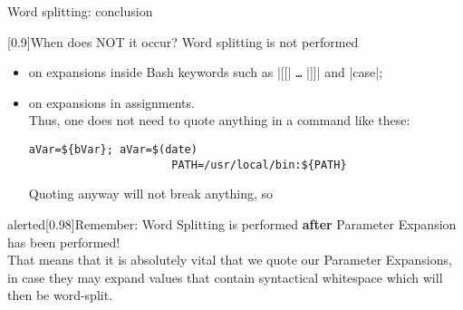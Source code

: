 \begin{frame}[fragile]{Word splitting: conclusion}
    \vspace{-4  mm}
        \begin{varblock*}{}[0.9\textwidth]{When does NOT it occur?}
        Word splitting is not performed
        \begin{itemize}
            \item on expansions inside Bash keywords such as \bash|[[| \texttt{\ldots} \bash|]]| and \bash|case|;
            \item on expansions in assignments. \\[0.3em] Thus, one does not need to quote anything in a command like these:
                  \begin{lstlisting}[style=MyBash, numbers=none, xrightmargin=45mm, belowskip=-5mm, aboveskip=2mm]
                      aVar=${bVar}; aVar=$(date)
                      PATH=/usr/local/bin:${PATH} 
                  \end{lstlisting}
                  Quoting anyway will not break anything, so 
        \end{itemize}
    \end{varblock*}
    \begin{varblock}{alerted}[0.98\textwidth]{Remember:}
        \alert{Word Splitting is performed \textbf{after} Parameter Expansion has been performed!} \\
        That means that it is absolutely vital that we quote our Parameter Expansions, in case they may expand values that contain syntactical whitespace which will then be word-split.
    \end{varblock}
\end{frame}
